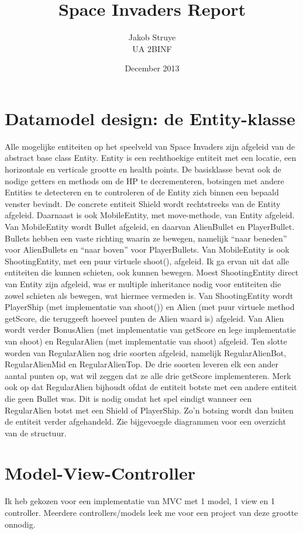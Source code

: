 \documentclass[11pt, a4paper]{article}
\begin{document}
\title{Space Invaders Report}
\author{Jakob Struye\\ UA 2BINF}
\date{December 2013}
\maketitle

\section{Datamodel design: de Entity-klasse}
Alle mogelijke entiteiten op het speelveld van Space Invaders zijn afgeleid van de abstract base class Entity. Entity is een rechthoekige entiteit met een locatie, een horizontale en verticale grootte en health points. De basisklasse bevat ook de nodige getters en methods om de HP te decrementeren, botsingen met andere Entities te detecteren en te controleren of de Entity zich binnen een bepaald venster bevindt. De concrete entiteit Shield wordt rechtstreeks van de Entity afgeleid. Daarnaast is ook MobileEntity, met move-methode, van Entity afgeleid. Van MobileEntity wordt Bullet afgeleid, en daarvan AlienBullet en PlayerBullet. Bullets hebben een vaste richting waarin ze bewegen, namelijk “naar beneden” voor AlienBullets en “naar boven” voor PlayerBullets. Van MobileEntity is ook ShootingEntity, met een puur virtuele shoot(), afgeleid. Ik ga ervan uit dat alle entiteiten die kunnen schieten, ook kunnen bewegen. Moest ShootingEntity direct van Entity zijn afgeleid, was er multiple inheritance nodig voor entiteiten die zowel schieten als bewegen, wat hiermee vermeden is. Van ShootingEntity wordt PlayerShip (met implementatie van shoot()) en Alien (met puur virtuele method getScore, die teruggeeft hoeveel punten de Alien waard is) afgeleid. Van Alien wordt verder BonusAlien (met implementatie van getScore en lege implementatie van shoot) en RegularAlien (met implementatie van shoot) afgeleid. Ten slotte worden van RegularAlien nog drie soorten afgeleid, namelijk RegularAlienBot, RegularAlienMid en RegularAlienTop. De drie soorten leveren elk een ander aantal punten op, wat wil zeggen dat ze alle drie getScore implementeren. Merk ook op dat RegularAlien bijhoudt ofdat de entiteit botste met een andere entiteit die geen Bullet was. Dit is nodig omdat het spel eindigt wanneer een RegularAlien botst met een Shield of PlayerShip. Zo'n botsing wordt dan buiten de entiteit verder afgehandeld.
Zie bijgevoegde diagrammen voor een overzicht van de structuur.

\section{Model-View-Controller}
 Ik heb gekozen voor een implementatie van MVC met 1 model, 1 view en 1 controller. Meerdere controllers/models leek me voor een project van deze grootte onnodig.
\end{document}
